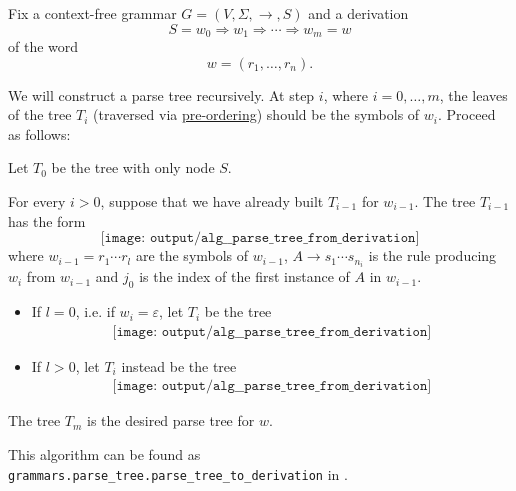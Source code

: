 \begin{algorithm}\label{alg:derivation_to_parse_tree}
  Fix a context-free grammar \( G = (V, \Sigma, \to, S) \) and a derivation
  \begin{equation*}
    S = w_0 \Rightarrow w_1 \Rightarrow \cdots \Rightarrow w_m = w
  \end{equation*}
  of the word
  \begin{equation*}
    w = (r_1, \ldots, r_n).
  \end{equation*}

  We will construct a parse tree recursively. At step \( i \), where \( i = 0, \ldots, m \), the leaves of the tree \( T_i \) (traversed via \hyperref[def:traversal_ordering]{pre-ordering}) should be the symbols of \( w_i \). Proceed as follows:
  \begin{thmenum}
     Let \( T_0 \) be the tree with only node \( S \).

     For every \( i > 0 \), suppose that we have already built \( T_{i-1} \) for \( w_{i-1} \). The tree \( T_{i-1} \) has the form
    \begin{equation*}
      \texttt{[image: output/alg\_\_parse\_tree\_from\_derivation]}
    \end{equation*}
    where \( w_{i-1} = r_1 \cdots r_l \) are the symbols of \( w_{i-1} \), \( A \to s_1 \cdots s_{n_i} \) is the rule producing \( w_i \) from \( w_{i-1} \) and \( j_0 \) is the index of the first instance of \( A \) in \( w_{i-1} \).

    \begin{itemize}
      \item If \( l = 0 \), i.e. if \( w_i = \varepsilon \), let \( T_i \) be the tree
      \begin{equation*}
        \begin{aligned}
          \texttt{[image: output/alg\_\_parse\_tree\_from\_derivation]}
        \end{aligned}
      \end{equation*}

      \item If \( l > 0 \), let \( T_i \) instead be the tree
      \begin{equation*}
        \begin{aligned}
          \texttt{[image: output/alg\_\_parse\_tree\_from\_derivation]}
        \end{aligned}
      \end{equation*}
    \end{itemize}
  \end{thmenum}

   The tree \( T_m \) is the desired parse tree for \( w \).
\end{algorithm}
\begin{comments}
  \item This algorithm can be found as \texttt{grammars.parse\_tree.parse\_tree\_to\_derivation} in \cite{code}.
\end{comments}


